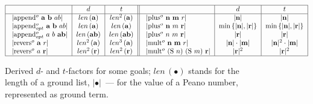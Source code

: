 \begin{figure}[t]
  \setlength{\belowcaptionskip}{-20pt plus 3pt minus 2pt}
  \[ \begin{tabular}{|l|c|c||l|c|c|}
    \hline
          & $d$ & $t$  & & $d$ & $t$ \\
    \hline
    \lstinline|append$^o$ $\mathbf{a}$ $\mathbf{b}$ ${ab}$|      & $len\,(\mathbf{a})$ & $len^2\,(\mathbf{a})$   & \lstinline|plus$^o$ $\mathbf{n}$ $\mathbf{m}$ ${r}$| & $|\mathbf{n}|$ & $|\mathbf{n}|$ \\
    \lstinline|append$_{opt}^o$ $\mathbf{a}$ $\mathbf{b}$ ${ab}$| & $len\,(\mathbf{a})$ & $len\,(\mathbf{a})$     & \lstinline|plus$^o$ $\mathbf{n}$ ${m}$ $\mathbf{r}$| & $\min\,\{|\mathbf{n}|, |\mathbf{r}|\}$ & $\min\,\{|\mathbf{n}|, |\mathbf{r}|\}$ \\
    \lstinline|append$_{opt}^o$ ${a}$ ${b}$ $\mathbf{ab}$|        & $len\,(\mathbf{ab})$ & $len\,(\mathbf{ab})$   & \lstinline|plus$^o$ ${n}$ ${m}$ $\mathbf{r}$| & $|\mathbf{r}|$ & $|\mathbf{r}|$ \\
    \lstinline|revers$^o$ $\mathbf{a}$ ${r}$|                    & $len^2\,(\mathbf{a})$ & $len^3\,(\mathbf{a})$ & \lstinline|mult$^o$ $\mathbf{n}$ $\mathbf{m}$ ${r}$| & $|\mathbf{n}|\cdot|\mathbf{m}|$ & $|\mathbf{n}|^2\cdot|\mathbf{m}|$ \\
    \lstinline|revers$^o$ ${a}$ $\mathbf{r}$|                    & $len^2\,(\mathbf{r})$ & $len^2\,(\mathbf{r})$ & \lstinline|mult$^o$ (S ${n}$) (S ${m}$) $\mathbf{r}$| & $|\mathbf{r}|^2$ & $|\mathbf{r}|^2$ \\
    \hline
  \end{tabular} \]
  \caption{Derived $d$- and $t$-factors for some goals; $len\,(\bullet)$ stands for the length of a ground list, $|\bullet|$~--- for the value of a Peano number, represented as ground term.}
  \label{fig:examples_all_complexities}
\end{figure}


